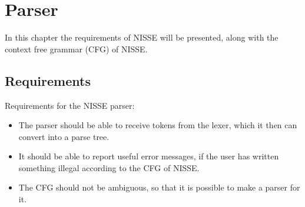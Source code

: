 \chapter{Parser}

In this chapter the requirements of NISSE will be presented, along with the context free grammar (CFG) of NISSE.

\section{Requirements}
Requirements for the NISSE parser:
\begin{itemize}
	\item The parser should be able to receive tokens from the lexer, which it then can convert into a parse tree.
	\item It should be able to report useful error messages, if the user has written something illegal according to the CFG of NISSE.
	\item The CFG should not be ambiguous, so that it is possible to make a parser for it. 
\end{itemize}

\newpage

